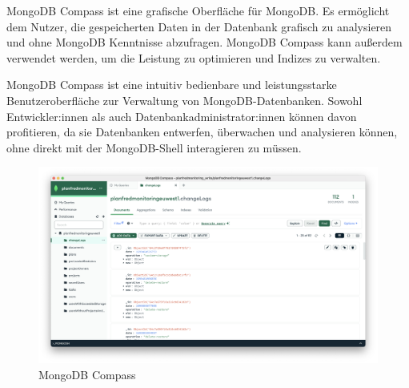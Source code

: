 MongoDB Compass ist eine grafische Oberfläche für MongoDB. Es ermöglicht dem Nutzer, die gespeicherten Daten in der Datenbank grafisch zu analysieren und ohne MongoDB Kenntnisse abzufragen. MongoDB Compass kann außerdem verwendet werden, um die Leistung zu optimieren und Indizes zu verwalten.\newline

MongoDB Compass ist eine intuitiv bedienbare und leistungsstarke Benutzeroberfläche zur Verwaltung von MongoDB-Datenbanken. Sowohl Entwickler:innen als auch Datenbankadministrator:innen können davon profitieren, da sie Datenbanken entwerfen, überwachen und analysieren können, ohne direkt mit der MongoDB-Shell interagieren zu müssen. 
\cite{mongo_compass}

\begin{figure}[h!]
    \centering
    \includegraphics[width=1\linewidth]{pics/mongodb-compass.png}
    \caption{MongoDB Compass}
    \label{fig:enter-label}
\end{figure}

